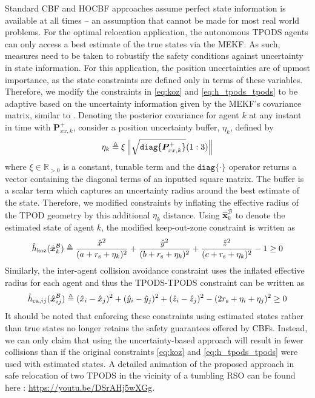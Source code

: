 Standard CBF and HOCBF approaches assume perfect state information is available at all times -- an assumption that cannot be made for most real world problems. For the optimal relocation application, the autonomous TPODS agents can only access a best estimate of the true states via the MEKF. As such, measures need to be taken to robustify the safety conditions against uncertainty in state information. For this application, the position uncertainties are of upmost importance, as the state constraints are defined only in terms of these variables. Therefore, we modify the constraints in \eqref{eq:koz} and \eqref{eq:h_tpods_tpods} to be adaptive based on the uncertainty information given by the MEKF's covariance matrix, similar to \cite{vanWijk_FTRTA}. Denoting the posterior covariance for agent $k$ at any instant in time with $\boldsymbol{P}^{+}_{xx,k}$, consider a position uncertainty buffer, $\eta_k$, defined by
\begin{align*}
    \eta_k \triangleq \xi \left\Vert \sqrt{\texttt{diag}\{ \boldsymbol{P}^{+}_{xx,k} \}}(1:3) \right\Vert
\end{align*}
where $\xi \in \mathbb{R}_{>0}$ is a constant, tunable term and the $\texttt{diag}\{ \cdot \}$ operator returns a vector containing the diagonal terms of an inputted square matrix. The buffer is a scalar term which captures an uncertainty radius around the best estimate of the state. Therefore, we modified constraints by inflating the effective radius of the TPOD geometry by this additional $\eta_k$ distance. Using $\hat{\boldsymbol{x}}_k^{\mathcal{B}}$ to denote the estimated state of agent $k$, the modified keep-out-zone constraint is written as  
\begin{align} \label{eq:koz_adaptive}
    \hat{h}_{\rm koz}(\hat{\boldsymbol{x}}_k^{\mathcal{B}}) \triangleq \frac{\hat{x}^2}{(a+r_{\rm s}+\eta_k)^2} + \frac{\hat{y}^2}{(b+r_{\rm s}+\eta_k)^2} + \frac{\hat{z}^2}{(c+r_{\rm s}+\eta_k)^2} - 1 \geq 0
\end{align}
Similarly, the inter-agent collision avoidance constraint uses the inflated effective radius for each agent and thus the TPODS-TPODS constraint can be written as
\begin{align} \label{eq:h_tpods_tpods_a}
    \hat{h}_{{\rm ca},ij}(\hat{\boldsymbol{x}}_{ij}^{\mathcal{B}}) \triangleq (\hat{x}_i - \hat{x}_j)^2 + (\hat{y}_i - \hat{y}_j)^2 + (\hat{z}_i - \hat{z}_j)^2 - (2r_{\rm s} + \eta_i + \eta_j)^2 \geq 0
\end{align}
It should be noted that enforcing these constraints using estimated states rather than true states no longer retains the safety guarantees offered by CBFs. Instead, we can only claim that using the uncertainty-based approach will result in fewer collisions than if the original constraints \eqref{eq:koz} and \eqref{eq:h_tpods_tpods} were used with estimated states. A detailed animation of the proposed approach in safe relocation of two TPODS in the vicinity of a tumbling RSO can be found here : \url{https://youtu.be/DSrAHj5wXGg}.

